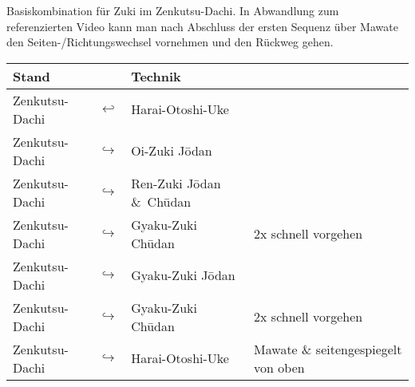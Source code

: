 \null\vfill\null
\begin{center}
	\parbox{\textwidth-2\tabcolsep}{Basiskombination für Zuki im Zenkutsu-Dachi. In Abwandlung zum referenzierten Video kann man nach Abschluss der ersten Sequenz über Mawate den Seiten-/Richtungswechsel vornehmen und den Rückweg gehen.}
\end{center}
\begin{tabularx}{\textwidth}{lllX}
	Stand	&&Technik	&\\
	\midrule
	Zenkutsu-Dachi 	& \(\hookleftarrow\) & Harai-Otoshi-Uke	&\\
	Zenkutsu-Dachi 	& \(\hookrightarrow\) & Oi-Zuki J\={o}dan	&\\
	Zenkutsu-Dachi 	& \(\hookrightarrow\) & Ren-Zuki J\={o}dan \&~Ch\={u}dan	&\\
	Zenkutsu-Dachi 	& \(\hookrightarrow\) & Gyaku-Zuki Ch\={u}dan	&2x schnell vorgehen\\
	Zenkutsu-Dachi 	& \(\hookrightarrow\) & Gyaku-Zuki J\={o}dan	&\\
	Zenkutsu-Dachi 	& \(\hookrightarrow\) & Gyaku-Zuki Ch\={u}dan	&2x schnell vorgehen\\
	Zenkutsu-Dachi 	& \(\hookrightarrow\) & Harai-Otoshi-Uke	& Mawate \& seitengespiegelt von oben\\
	\midrule
\end{tabularx}\\\null\vfill\null